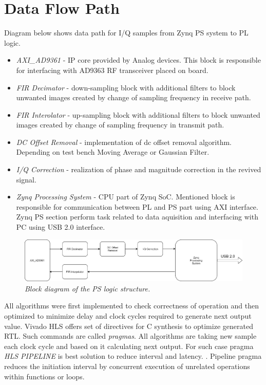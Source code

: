 \documentclass[en,printmode]{mgr}
\begin{document}
	\section{Data Flow Path}
	Diagram below shows data path for I/Q samples from Zynq PS system to PL logic.
	
	\begin{itemize}
		\item \textit{AXI_AD9361} - IP core provided by Analog devices. This block is responsible for
			interfacing with AD9363 RF transceiver placed on board. 
		\item \textit{FIR Decimator} - down-sampling block with additional filters to block unwanted
			images created by change of sampling frequency in receive path.
		\item \textit{FIR Interolator} - up-sampling block with additional filters to block unwanted
			images created by change of sampling frequency in transmit path.
		\item \textit{DC Offset Removal} - implementation of dc offset removal algorithm. 
			Depending on test bench Moving Average or Gaussian Filter.
		\item \textit{I/Q Correction} - realization of phase and magnitude correction in the revived
		 	signal.
		\item \textit{Zynq Processing System} - CPU part of Zynq SoC. Mentioned block is responsible for
			communication between PL and PS part using AXI interface. Zynq PS section perform task
			related to data aquisition and interfacing with PC using USB 2.0 interface.
	\end{itemize}
	
	\begin{figure}[H]
    	\centering
   		\includegraphics[width=\textheight, angle =90]{diag/hdl.png}
    	\caption{\textit{Block diagram of the PS logic structure.}}
    	\label{fig:polarplot}
	\end{figure}

	\newpage
		All algorithms were first implemented to check correctness of operation and then optimized to
		minimize delay and clock cycles required to generate next output value.
		Vivado HLS offers set of directives for C synthesis to optimize generated RTL.
		Such commands are called
		\textit{pragmas}.  All algorithms are taking new sample each clock cycle and based on it
		calculating next output. For such case pragma \textit{HLS PIPELINE} is best solution to
		reduce interval and latency.
		\cite{hls_optimize}.
		Pipeline pragma reduces the initiation interval by concurrent execution of
		unrelated operations within functions or loops.
		
\end{document}
